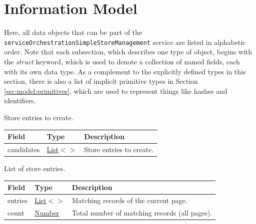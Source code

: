 \documentclass[a4paper]{arrowhead}
\newcommand{\mref}[2][]{{\textcolor{ArrowheadPurple}{\hyperref[sec:model:#2]{\ifstrempty{#1}{#2}{#1}}}}}
\newcommand{\pref}[1]{{\textcolor{ArrowheadGrey}{\hyperref[sec:model:primitives:#1]{#1}}}}
\begin{document}
\newpage

\section{Information Model}
\label{sec:model}

Here, all data objects that can be part of the \texttt{service\allowbreak{}Orchestration\allowbreak{}Simple\allowbreak{}Store\allowbreak{}Management} service are listed in alphabetic order.
Note that each subsection, which describes one type of object, begins with the \textit{struct} keyword, which is used to denote a collection of named fields, each with its own data type.
As a complement to the explicitly defined types in this section, there is also a list of implicit primitive types in Section \ref{sec:model:primitives}, which are used to represent things like hashes and identifiers.


Store entries to create.


\noindent\begin{tabularx}{\textwidth}{| >{\raggedright\arraybackslash}p{3.9cm} | >{\raggedright\arraybackslash\small}p{5.3cm} | X |} \hline
\rowcolor{gray!33} Field & Type & Description \\ \hline
candidates & \pref{List}$<$\allowbreak{}\mref[Orchestration\allowbreak{}Simple\allowbreak{}Store\allowbreak{}Request]{OrchestrationSimpleStoreRequest}$>$ & Store entries to create. \\ \hline
\end{tabularx}




List of store entries.


\noindent\begin{tabularx}{\textwidth}{| >{\raggedright\arraybackslash}p{3.9cm} | >{\raggedright\arraybackslash\small}p{5.3cm} | X |} \hline
\rowcolor{gray!33} Field & Type & Description \\ \hline
entries & \pref{List}$<$\allowbreak{}\mref[Orchestration\allowbreak{}Simple\allowbreak{}Store\allowbreak{}Response]{OrchestrationSimpleStoreResponse}$>$ & Matching records of the current page. \\ \hline
count & \pref{Number} & Total number of matching records (all pages). \\ \hline
\end{tabularx}
\end{document}
